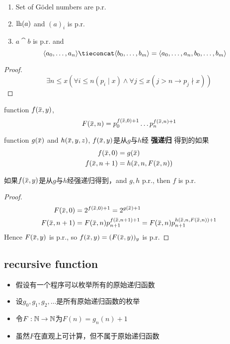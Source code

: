 \documentclass[11pt]{article}
\begin{document}
\begin{lemma}[]
\begin{enumerate}
\item Set of Gödel numbers are p.r.
\item \(\operatorname{lh}(a)\) and \((a)_i\) is p.r.
\item \(a\tieconcat b\) is p.r. and
\begin{equation*}
\la a_0,\dots,a_n\ra\tieconcat\la b_0,\dots,b_m\ra=\la a_0,\dots,a_n,b_0,\dots,b_m\ra
\end{equation*}
\end{enumerate}
\end{lemma}

\begin{proof}
  \begin{equation*}
\exists n\le x\left( \forall i\le n(p_i\mid x)\wedge\forall j\le x(j>n\to p_j\nmid x) \right)
  \end{equation*}
\end{proof}

function \(f(\barx,y)\),
  \begin{equation*}
F(\barx,n)=p_0^{f(\barx,0)+1}\dots p_n^{f(\barx,n)+1}
  \end{equation*}

\begin{definition}[]
function \(g(\barx)\) and \(h(\barx,y,z)\), \(f(\barx,y)\)是从\(g\)与\(h\)经 \textbf{强递归} 得到的如果
  \begin{align*}
f(\barx,0)&=g(\barx)\\
f(\barx,n+1)&=h(\barx,n,F(\barx,n))
  \end{align*}
\end{definition}

\begin{lemma}[]
如果\(f(\barx,y)\)是从\(g\)与\(h\)经强递归得到，and  \(g,h\) p.r., then \(f\) is p.r.
\end{lemma}

\begin{proof}
  \begin{align*}
F(\barx,0)&=2^{f(\barx,0)+1}=2^{g(\barx)+1}\\
F(\barx,n+1)&=F(\barx,n)p_{n+1}^{f(\barx,n+1)+1}=F(\barx,n)p_{n+1}^{h(\barx,n,F(\barx,n))+1}
  \end{align*}
Hence \(F(\barx,y)\) is p.r., so \(f(\barx,y)=(F(\barx,y))_y\) is p.r.
\end{proof}
\subsection{recursive function}
\label{sec:orge6e5fa9}
\begin{itemize}
\item 假设有一个程序可以枚举所有的原始递归函数
\item 设\(g_0,g_1,g_2,\dots\)是所有原始递归函数的枚举
\item 令\(F:\mathbb{N}\to\mathbb{N}\)为\(F(n)=g_n(n)+1\)
\item 虽然\(F\)在直观上可计算，但不属于原始递归函数
\end{itemize}
\end{document}
